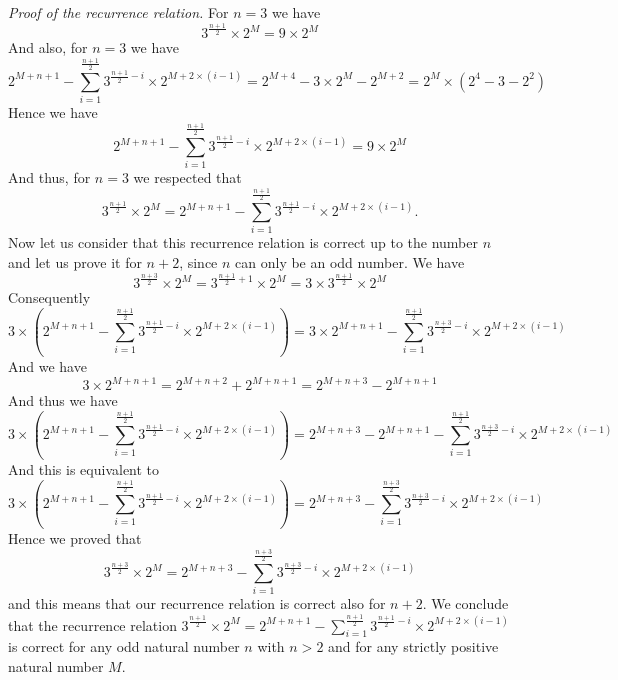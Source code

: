 \documentclass[11pt,a4paper]{article}
\theoremstyle{definition}
\begin{document}
\medskip\noindent\emph{Proof of the recurrence relation.} For $n=3$ we have
\begin{equation}
3^{\frac{n+1}{2}}\times 2^{M}=9\times 2^{M}
\end{equation}
And also, for $n=3$ we have
\begin{equation}
2^{M+n+1}-\sum_{i=1}^{\frac{n+1}{2}}3^{\frac{n+1}{2}-i}\times 2^{M+2\times(i-1)}
=2^{M+4}-3\times 2^{M}-2^{M+2}=2^{M}\times\left(2^{4}-3-2^{2}\right)
\end{equation}
Hence we have
\begin{equation}
2^{M+n+1}-\sum_{i=1}^{\frac{n+1}{2}}3^{\frac{n+1}{2}-i}\times 2^{M+2\times(i-1)}=9\times 2^{M}
\end{equation}
And thus, for $n=3$ we respected that
\begin{equation}
3^{\frac{n+1}{2}}\times 2^{M}=2^{M+n+1}-\sum_{i=1}^{\frac{n+1}{2}}3^{\frac{n+1}{2}-i}\times 2^{M+2\times(i-1)}.
\end{equation}
Now let us consider that this recurrence relation is correct up to the number $n$ and let
us prove it for $n+2$, since $n$ can only be an odd number. We have
\begin{equation}
3^{\frac{n+3}{2}}\times 2^{M}=3^{\frac{n+1}{2}+1}\times 2^{M}=3\times 3^{\frac{n+1}{2}}\times 2^{M}
\end{equation}
Consequently
\begin{equation}
3\times\left(2^{M+n+1}-\sum_{i=1}^{\frac{n+1}{2}}3^{\frac{n+1}{2}-i}\times 2^{M+2\times(i-1)}\right)
=3\times 2^{M+n+1}-\sum_{i=1}^{\frac{n+1}{2}}3^{\frac{n+3}{2}-i}\times 2^{M+2\times(i-1)}
\end{equation}
And we have
\begin{equation}
3\times 2^{M+n+1}=2^{M+n+2}+2^{M+n+1}=2^{M+n+3}-2^{M+n+1}
\end{equation}
And thus we have
\begin{equation}
3\times\left(2^{M+n+1}-\sum_{i=1}^{\frac{n+1}{2}}3^{\frac{n+1}{2}-i}\times 2^{M+2\times(i-1)}\right)
=2^{M+n+3}-2^{M+n+1}-\sum_{i=1}^{\frac{n+1}{2}}3^{\frac{n+3}{2}-i}\times 2^{M+2\times(i-1)}
\end{equation}
And this is equivalent to
\begin{equation}
3\times\left(2^{M+n+1}-\sum_{i=1}^{\frac{n+1}{2}}3^{\frac{n+1}{2}-i}\times 2^{M+2\times(i-1)}\right)
=2^{M+n+3}-\sum_{i=1}^{\frac{n+3}{2}}3^{\frac{n+3}{2}-i}\times 2^{M+2\times(i-1)}
\end{equation}
Hence we proved that
\begin{equation}
3^{\frac{n+3}{2}}\times 2^{M}=2^{M+n+3}-\sum_{i=1}^{\frac{n+3}{2}}3^{\frac{n+3}{2}-i}\times 2^{M+2\times(i-1)}
\end{equation}
and this means that our recurrence relation is correct also for $n+2$. We conclude that
the recurrence relation
$3^{\frac{n+1}{2}}\times 2^{M}=2^{M+n+1}-\sum_{i=1}^{\frac{n+1}{2}}3^{\frac{n+1}{2}-i}\times 2^{M+2\times(i-1)}$
is correct for any odd natural number $n$ with $n>2$ and for any strictly positive natural
number $M$.
\end{document}
